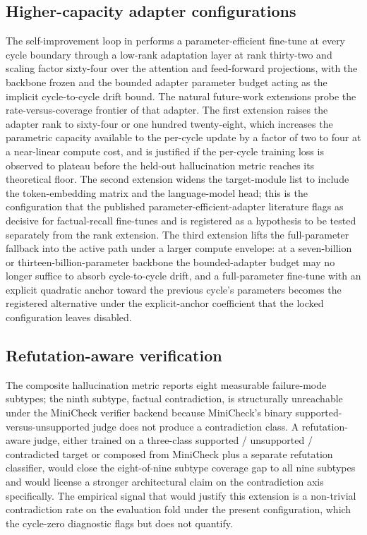 \subsection{Higher-capacity adapter configurations}
\label{sec:future-lora}

The self-improvement loop in  performs a parameter-efficient fine-tune at every cycle boundary through a low-rank adaptation layer at rank thirty-two and scaling factor sixty-four over the attention and feed-forward projections, with the backbone frozen and the bounded adapter parameter budget acting as the implicit cycle-to-cycle drift bound. The natural future-work extensions probe the rate-versus-coverage frontier of that adapter. The first extension raises the adapter rank to sixty-four or one hundred twenty-eight, which increases the parametric capacity available to the per-cycle update by a factor of two to four at a near-linear compute cost, and is justified if the per-cycle training loss is observed to plateau before the held-out hallucination metric reaches its theoretical floor. The second extension widens the target-module list to include the token-embedding matrix and the language-model head; this is the configuration that the published parameter-efficient-adapter literature flags as decisive for factual-recall fine-tunes and is registered as a hypothesis to be tested separately from the rank extension. The third extension lifts the full-parameter fallback into the active path under a larger compute envelope: at a seven-billion or thirteen-billion-parameter backbone the bounded-adapter budget may no longer suffice to absorb cycle-to-cycle drift, and a full-parameter fine-tune with an explicit quadratic anchor toward the previous cycle's parameters becomes the registered alternative under the explicit-anchor coefficient that the locked configuration leaves disabled.

\subsection{Refutation-aware verification}
\label{sec:future-refutation}

The composite hallucination metric reports eight measurable failure-mode subtypes; the ninth subtype, factual contradiction, is structurally unreachable under the MiniCheck verifier backend because MiniCheck's binary supported-versus-unsupported judge does not produce a contradiction class. A refutation-aware judge, either trained on a three-class supported / unsupported / contradicted target or composed from MiniCheck plus a separate refutation classifier, would close the eight-of-nine subtype coverage gap to all nine subtypes and would license a stronger architectural claim on the contradiction axis specifically. The empirical signal that would justify this extension is a non-trivial contradiction rate on the evaluation fold under the present configuration, which the cycle-zero diagnostic flags but does not quantify.

